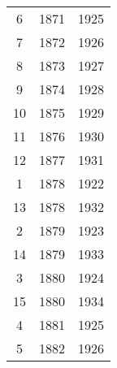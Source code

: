 % 
\begin{tabular}{ccc}
  \hline
  \hline
6 & 1871 & 1925 \\ 
  7 & 1872 & 1926 \\ 
  8 & 1873 & 1927 \\ 
  9 & 1874 & 1928 \\ 
  10 & 1875 & 1929 \\ 
  11 & 1876 & 1930 \\ 
  12 & 1877 & 1931 \\ 
  1 & 1878 & 1922 \\ 
  13 & 1878 & 1932 \\ 
  2 & 1879 & 1923 \\ 
  14 & 1879 & 1933 \\ 
  3 & 1880 & 1924 \\ 
  15 & 1880 & 1934 \\ 
  4 & 1881 & 1925 \\ 
  5 & 1882 & 1926 \\ 
   \hline
\end{tabular}
